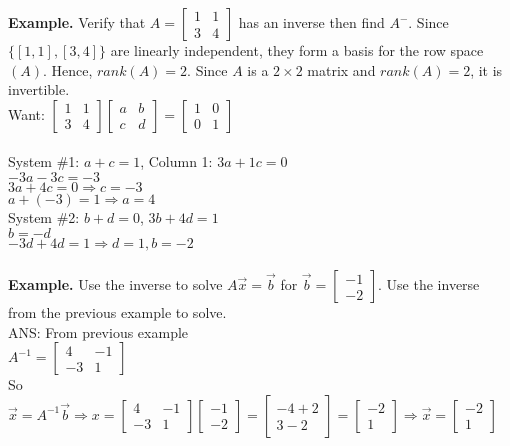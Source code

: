 \documentclass [12pt]{article}
\begin{document}
\noindent\textbf{Example. }Verify that $A=\begin{bmatrix}
1&1\\
3&4
\end{bmatrix}$ has an inverse then find $A^-$. Since $\{[1,1],[3,4]\}$ are linearly independent, they form a basis for the row space $(A)$. Hence, $rank(A)=2$. Since $A$ is a $2\times2$ matrix and $rank(A)=2$, it is invertible.\\
Want: $\begin{bmatrix}
1&1\\
3&4
\end{bmatrix}\begin{bmatrix}
a&b\\
c&d
\end{bmatrix}=\begin{bmatrix}
1&0\\
0&1
\end{bmatrix}$\\\\
\pagebreak
System \#1: $a+c=1$, Column 1: $3a+1c=0$\\
$-3a-3c=-3$\\
$3a+4c=0\Rightarrow c=-3$\\
$a+(-3)=1\Rightarrow a=4$\\
System \#2: $b+d=0$, $3b+4d=1$\\
$b=-d$\\
$-3d+4d=1\Rightarrow d=1, b=-2$\\\\
\noindent\textbf{Example. }Use the inverse to solve $A\overrightarrow{x}=\overrightarrow{b}$ for $\overrightarrow{b}=\begin{bmatrix}
-1\\
-2
\end{bmatrix}$. Use the inverse from the previous example to solve.\\
ANS: From previous example\\
$A^{-1}=\begin{bmatrix}
4&-1\\
-3&1
\end{bmatrix}$\\
So $\overrightarrow{x}=A^{-1}\overrightarrow{b}\Rightarrow x=\begin{bmatrix}
4&-1\\
-3&1
\end{bmatrix}\begin{bmatrix}
-1\\
-2
\end{bmatrix}=\begin{bmatrix}
-4+2\\
3-2
\end{bmatrix}=\begin{bmatrix}
-2\\
1
\end{bmatrix}\Rightarrow\overrightarrow{x}=\begin{bmatrix}
-2\\
1
\end{bmatrix}$\\\\
\end{document}
